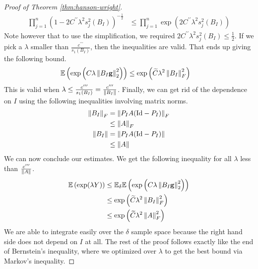 \documentclass[11pt]{article}
\begin{document}
\begin{proof}[Proof of Theorem \ref{thm:hanson-wright}]
\begin{align*}
    \prod_{j=1}^n \left( 1 - 2 C^{\prime \prime} \lambda^2 s_j^2(B_I) \right)^{-\frac{1}{2}}
    &\leq \prod_{j=1}^n \exp\left( 2 C^{\prime \prime} \lambda^2 s_j^2(B_I) \right)
  \end{align*}
  Note however that to use the simplification, we required $2 C^{\prime \prime} \lambda^2 s_j^2(B_I) \leq \frac{1}{2}$.
  If we pick a $\lambda$ smaller than $\frac{c^{\prime \prime \prime}}{s_1(B_I)}$, then the inequalities are valid.
  That ends up giving the following bound.
  \begin{align*}
    \mathbb{E}\left( \exp\left( C \lambda \left\lVert B_I \mathbf{g}\right\rVert_2^2 \right) \right)
    &\leq \exp\left( \widetilde{C} \lambda^2 \left\lVert B_I\right\rVert_F^2 \right)
  \end{align*}
  This is valid when $\lambda \leq \frac{c^{\prime \prime \prime}}{s_1(B_I)} = \frac{c^{\prime \prime \prime}}{\left\lVert B_I\right\rVert}$.
  Finally, we can get rid of the dependence on $I$ using the following inequalities involving matrix norms.
  \begin{align*}
    \left\lVert B_I\right\rVert_F &= \left\lVert P_IA(\mathrm{Id} - P_I)\right\rVert_F \\ &\leq \left\lVert A\right\rVert_F \\
    \left\lVert B_I\right\rVert &= \left\lVert P_IA(\mathrm{Id} - P_I)\right\rVert \\ &\leq \left\lVert A\right\rVert
  \end{align*}
  We can now conclude our estimates. We get the following inequality for all $\lambda$ less than $\frac{c^{\prime \prime \prime}}{\left\lVert A\right\rVert}$.
  \begin{align*}
    \mathbb{E}\left( \exp(\lambda Y) \right)
    &\leq \mathbb{E}_{\delta} \mathbb{E}\left( \exp\left( C \lambda \left\lVert B_I \mathbf{g}\right\rVert_2^2 \right) \right) \\
    &\leq \exp\left( \widetilde{C} \lambda^2 \left\lVert B_I\right\rVert_F^2 \right) \\
    &\leq \exp\left( \widetilde{C} \lambda^2 \left\lVert A\right\rVert_F^2 \right)
  \end{align*}
  We are able to integrate easily over the $\delta$ sample space because the right hand side does not depend on $I$ at all.
  The rest of the proof follows exactly like the end of Bernstein's inequality, where we optimized over $\lambda$ to get the best bound via Markov's inequality.
\end{proof}
\end{document}
